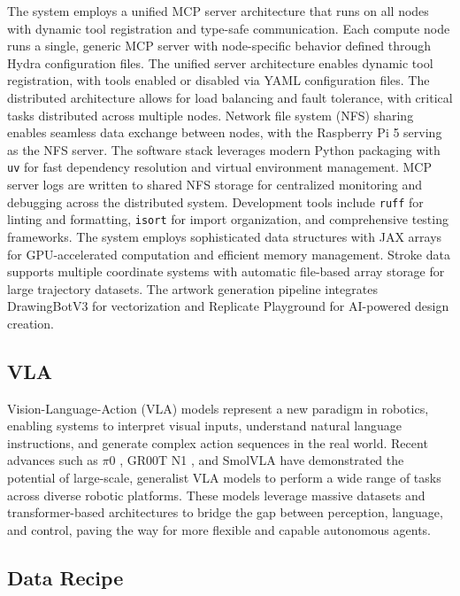 \documentclass[11pt]{article}
\begin{document}
The system employs a unified MCP server architecture that runs on all nodes with dynamic tool registration and type-safe communication.
Each compute node runs a single, generic MCP server with node-specific behavior defined through Hydra configuration files.
The unified server architecture enables dynamic tool registration, with tools enabled or disabled via YAML configuration files.
The distributed architecture allows for load balancing and fault tolerance, with critical tasks distributed across multiple nodes.
Network file system (NFS) sharing enables seamless data exchange between nodes, with the Raspberry Pi 5 serving as the NFS server.
The software stack leverages modern Python packaging with \texttt{uv} for fast dependency resolution and virtual environment management.
MCP server logs are written to shared NFS storage for centralized monitoring and debugging across the distributed system.
Development tools include \texttt{ruff} for linting and formatting, \texttt{isort} for import organization, and comprehensive testing frameworks.
The system employs sophisticated data structures with JAX arrays for GPU-accelerated computation and efficient memory management.
Stroke data supports multiple coordinate systems with automatic file-based array storage for large trajectory datasets.
The artwork generation pipeline integrates DrawingBotV3 for vectorization and Replicate Playground for AI-powered design creation.

\subsection{VLA}

Vision-Language-Action (VLA) models represent a new paradigm in robotics, enabling systems to interpret visual inputs, understand natural language instructions, and generate complex action sequences in the real world.
Recent advances such as $\pi$0 \cite{Black2024pi0}, GR00T N1 \cite{Bjorck2025gr00t}, and SmolVLA \cite{Shukor2025smolvla} have demonstrated the potential of large-scale, generalist VLA models to perform a wide range of tasks across diverse robotic platforms.
These models leverage massive datasets and transformer-based architectures to bridge the gap between perception, language, and control, paving the way for more flexible and capable autonomous agents.

\subsection{Data Recipe}
\end{document}
